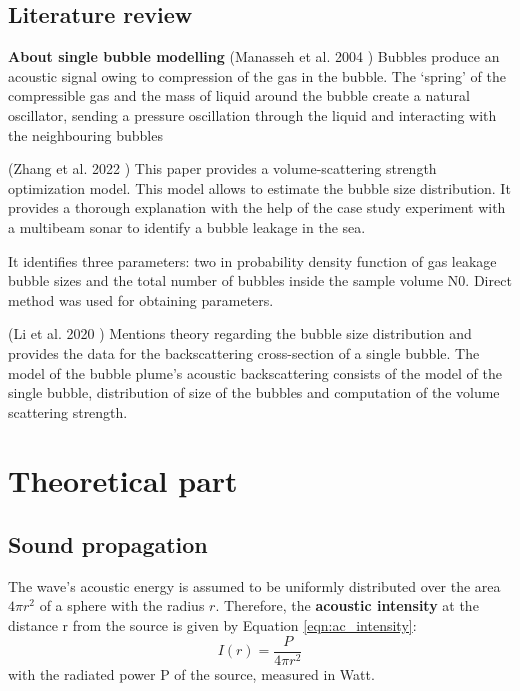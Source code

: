 \documentclass[11pt]{article}
\begin{document}
\subsection{Literature review}

\textbf{About single bubble modelling} 
(Manasseh et al. 2004 \cite{manasseh_anisotropy_2004}) Bubbles produce an acoustic signal owing to compression of the gas in the bubble. The ‘spring’ of the compressible gas and the mass of liquid around the bubble create a natural oscillator, sending a pressure oscillation through the liquid and interacting with the neighbouring bubbles

(Zhang et al. 2022 \cite{zhang_efficient_2022} ) This paper provides a volume-scattering strength optimization model. This model allows to estimate the bubble size distribution. It provides a thorough explanation with the help of the case study experiment with a multibeam sonar to identify a bubble leakage in the sea.

It identifies three parameters: two in probability density function of gas leakage bubble sizes and the total number of bubbles inside the sample volume N0. Direct method was used for obtaining parameters.

(Li et al. 2020 \cite{li_broadband_2020}) Mentions theory regarding the bubble size distribution and provides the data for the backscattering cross-section of a single bubble. The model of the bubble plume’s acoustic backscattering consists of the model of the single bubble, distribution of size of the bubbles and computation of the volume scattering strength.

\section{Theoretical part}
\subsection{Sound propagation}
The wave’s acoustic energy is assumed to be uniformly distributed over the area $4\pi r^{2}$ of a sphere with the radius $r$. Therefore, the \textbf{acoustic intensity} at the distance r from the source is given by Equation \ref{eqn:ac_intensity}:
\begin{equation} 
\label{eqn:ac_intensity}
I(r) = \frac{P}{4\pi r^{2}}
\end{equation}
with the radiated power P of the source, measured in Watt.
\end{document}
